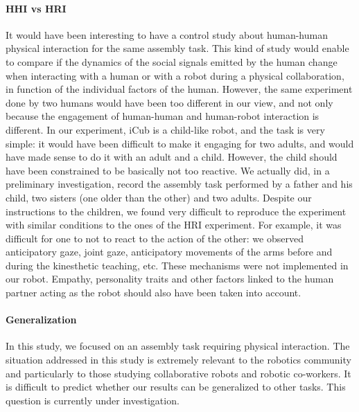 \paragraph{HHI vs HRI}

It would have been interesting to have a control study about human-human physical interaction for the same assembly task. This kind of study would enable to compare if the dynamics of the social signals emitted by the human change when interacting with a human or with a robot during a physical collaboration, in function of the individual factors of the human. 
However, the same experiment done by two humans would have been too different in our view, and not only because the engagement of human-human and human-robot interaction is different.
In our experiment, iCub is a child-like robot, and the task is very simple: it would have been difficult to make it engaging for two adults, and would have made sense to do it with an adult and a child. However, the child should have been constrained to be basically not too reactive. 
We actually did, in a preliminary investigation, record the assembly task performed by a father and his child, two sisters (one older than the other) and two adults. Despite our instructions to the children, we found very difficult to reproduce the experiment with similar conditions to the ones of the HRI experiment. 
For example, 
it was difficult for one to not to react to the action of the other:
we observed anticipatory gaze, joint gaze, anticipatory movements of the arms before and during the kinesthetic teaching, etc. These mechanisms were not implemented in our robot. Empathy, personality traits and other factors linked to the human partner acting as the robot should also have been taken into account.


\paragraph{Generalization}

In this study, we focused on an assembly task requiring physical interaction. The situation addressed in this study is extremely relevant to the robotics community and particularly to those studying collaborative robots and robotic co-workers. It is difficult to predict whether our results can be generalized to other tasks. This question is currently under investigation.

